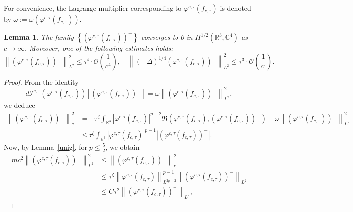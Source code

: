 \documentclass{amsart}
\theoremstyle{plain}
\newtheorem{lemma}[theorem]{Lemma}
\theoremstyle{definition}
\theoremstyle{remark}
\numberwithin{equation}{section} \numberwithin{figure}{section}
\begin{document}
    For convenience, the Lagrange multiplier corresponding to $\varphi^{c,\tau}(f_{c, \tau})$ is denoted by  
    $\omega := \omega\left(\varphi^{c,\tau}(f_{c, \tau})\right)$.  
    \begin{lemma}\label{stb_1}
    The family $\left\{\left(\varphi^{c,\tau}(f_{c, \tau})\right)^-\right\}$ converges to 0 in $H^{1/2}(\mathbb{R}^3,\mathbb{C}^4)$ as $c \to \infty$. Moreover, one of the following estimates holds:
    \[
    \left\|\left(\varphi^{c,\tau}(f_{c, \tau})\right)^-\right\|_{L^2}^2 \leq \tau^4 \cdot \mathcal{O}\left(\frac{1}{c^4}\right), \quad
    \left\|(-\Delta)^{1/4}\left(\varphi^{c,\tau}(f_{c, \tau})\right)^-\right\|_{L^2}^2 \leq \tau^3 \cdot \mathcal{O}\left(\frac{1}{c^2}\right).
    \]
    \end{lemma}
    
    \begin{proof}
    From the identity
    \[
    d\mathcal{I}^{c,\tau}\left(\varphi^{c,\tau}(f_{c, \tau})\right)\left[\left(\varphi^{c,\tau}(f_{c, \tau})\right)^-\right] = \omega \left\|\left(\varphi^{c,\tau}(f_{c, \tau})\right)^-\right\|_{L^2}^2,
    \]
    we deduce
    \begin{equation*}
    \begin{aligned}
    \left\|\left(\varphi^{c,\tau}(f_{c, \tau})\right)^-\right\|_c^2 
    &= -\tau^{\zeta} \int_{\mathbb{R}^3} \left|\varphi^{c,\tau}(f_{c, \tau})\right|^{p-2} \Re\left( \varphi^{c,\tau}(f_{c, \tau}), \left(\varphi^{c,\tau}(f_{c, \tau})\right)^- \right) 
    - \omega \left\|\left(\varphi^{c,\tau}(f_{c, \tau})\right)^-\right\|_{L^2}^2 \\
    &\leq \tau^{\zeta} \int_{\mathbb{R}^3} \left|\varphi^{c,\tau}(f_{c, \tau})\right|^{p-1} \left|\left(\varphi^{c,\tau}(f_{c, \tau})\right)^-\right|.
    \end{aligned}
    \end{equation*}
    Now, by Lemma~\ref{unig}, for $p \leq \frac{5}{2}$, we obtain
    \begin{equation*}
    \begin{aligned}
    m c^2 \left\|\left(\varphi^{c,\tau}(f_{c, \tau})\right)^-\right\|_{L^2}^2 
    &\leq \left\|\left(\varphi^{c,\tau}(f_{c, \tau})\right)^-\right\|_c^2 \\
    &\leq \tau^{\zeta} \left\|\varphi^{c,\tau}(f_{c, \tau})\right\|_{L^{2p-2}}^{p-1} \left\|\left(\varphi^{c,\tau}(f_{c, \tau})\right)^-\right\|_{L^2} \\
    &\leq C \tau^2 \left\|\left(\varphi^{c,\tau}(f_{c, \tau})\right)^-\right\|_{L^2},
    \end{aligned}

\end{equation*}
\end{proof}
\end{document}
